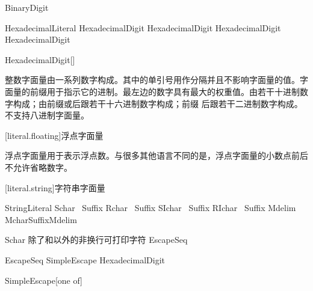 \begin{bnf}{BinaryDigit}
     \br
\end{bnf}

\begin{bnf}{HexadecimalLiteral}
     HexadecimalDigit \bnflp\terminal{_}\bnfq HexadecimalDigit\bnfrp\bnfs
     HexadecimalDigit \bnflp\terminal{_}\bnfq HexadecimalDigit\bnfrp\bnfs
\end{bnf}

\begin{bnf}{HexadecimalDigit}[\oneof]
     \br
     \br
\end{bnf}

\pnum
整数字面量由一系列数字构成。其中的单引号用作分隔并且不影响字面量的值。字面量的前缀用于指示它的进制。最左边的数字具有最大的权重值。由若干十进制数字构成；由前缀或后跟若干十六进制数字构成；前缀  后跟若干二进制数字构成。\X 不支持八进制字面量。

[literal.floating]{浮点字面量}

\pnum
浮点字面量用于表示浮点数。与很多其他语言不同的是，浮点字面量的小数点前后不允许省略数字。

[literal.string]{字符串字面量}

\begin{bnf}{StringLiteral}
     Schar\bnfs\  Suffix\bnfq \br
     Rchar\bnfs\  Suffix\bnfq \br
     SIchar\bnfs\  Suffix\bnfq \br
     RIchar\bnfs\  Suffix\bnfq \br
    Mdelim Mchar\bnfs Suffix\bnfq Mdelim
\end{bnf}

\begin{bnf}{Schar}
    \textnormal{除了\terminal{\textbackslash}和以外的非换行可打印字符} \br
    EscapeSeq
\end{bnf}

\begin{bnf}{EscapeSeq}
    \terminal{\textbackslash} SimpleEscape \br
     HexadecimalDigit\bnfp \terminal{\}}
\end{bnf}

\begin{bnf}{SimpleEscape}[one of]
\end{bnf}

